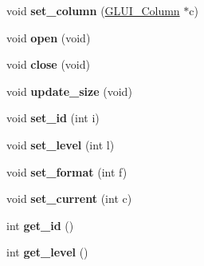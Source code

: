 \begin{DoxyCompactItemize}
\item 
\hypertarget{class_g_l_u_i___tree_a29c44f7e03795432a29107cfb0caf3ab}{void {\bfseries set\+\_\+column} (\hyperlink{class_g_l_u_i___column}{G\+L\+U\+I\+\_\+\+Column} $\ast$c)}\label{class_g_l_u_i___tree_a29c44f7e03795432a29107cfb0caf3ab}

\item 
\hypertarget{class_g_l_u_i___tree_a9dcfded5ecce182b218e12e207d0a0c4}{void {\bfseries open} (void)}\label{class_g_l_u_i___tree_a9dcfded5ecce182b218e12e207d0a0c4}

\item 
\hypertarget{class_g_l_u_i___tree_a301fe11a1a7bcb344e6fd5eca5915bce}{void {\bfseries close} (void)}\label{class_g_l_u_i___tree_a301fe11a1a7bcb344e6fd5eca5915bce}

\item 
\hypertarget{class_g_l_u_i___tree_ae74e9b85940ce63ebac36ef650e845ae}{void {\bfseries update\+\_\+size} (void)}\label{class_g_l_u_i___tree_ae74e9b85940ce63ebac36ef650e845ae}

\item 
\hypertarget{class_g_l_u_i___tree_a4508292bef2dd0bdaed4a4806b950a5e}{void {\bfseries set\+\_\+id} (int i)}\label{class_g_l_u_i___tree_a4508292bef2dd0bdaed4a4806b950a5e}

\item 
\hypertarget{class_g_l_u_i___tree_a1978367b73bb522adc7995e6bf7c8c98}{void {\bfseries set\+\_\+level} (int l)}\label{class_g_l_u_i___tree_a1978367b73bb522adc7995e6bf7c8c98}

\item 
\hypertarget{class_g_l_u_i___tree_ad650ae32ac0061df975433cd2a93374f}{void {\bfseries set\+\_\+format} (int f)}\label{class_g_l_u_i___tree_ad650ae32ac0061df975433cd2a93374f}

\item 
\hypertarget{class_g_l_u_i___tree_ac9a7d0223c26a6ddee9eba5f3872e8ef}{void {\bfseries set\+\_\+current} (int c)}\label{class_g_l_u_i___tree_ac9a7d0223c26a6ddee9eba5f3872e8ef}

\item 
\hypertarget{class_g_l_u_i___tree_a586224df7ba4df860a1cb90d00b754f7}{int {\bfseries get\+\_\+id} ()}\label{class_g_l_u_i___tree_a586224df7ba4df860a1cb90d00b754f7}

\item 
\hypertarget{class_g_l_u_i___tree_aeb41bc5144951acc90520e0d6d494309}{int {\bfseries get\+\_\+level} ()}\label{class_g_l_u_i___tree_aeb41bc5144951acc90520e0d6d494309}


\end{DoxyCompactItemize}
